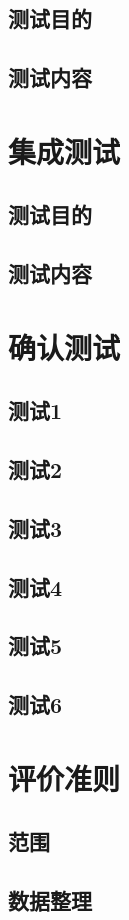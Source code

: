 \documentclass[
    report,     %
    oneside,    %
    UTF8,       %
    zihao=-4    %
]{config} %
\begin{document}
\subsection{测试目的}
\subsection{测试内容}
\section{集成测试}
\subsection{测试目的}
\subsection{测试内容}
\section{确认测试}
\subsection{测试1}
\subsection{测试2}
\subsection{测试3}
\subsection{测试4}
\subsection{测试5}
\subsection{测试6}

\section{评价准则}
\subsection{范围}
\subsection{数据整理}
\end{document}
